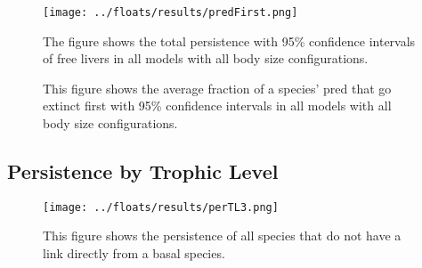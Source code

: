 \documentclass[11pt]{amsart}
\begin{document}
\begin{figure}[h]
\captionsetup[subfigure]{labelfont = it, textfont = it,labelformat = parens,labelsep = space}
    \begin{minipage}{.45\textwidth}
    \end{minipage}
    \begin{minipage}{.45\textwidth}
    \end{minipage}
    \texttt{[image: ../floats/results/predFirst.png]}
\caption{The figure shows the total persistence with 95\% confidence intervals of free livers in all models with all body size configurations.}
    \begin{minipage}{.45\textwidth}
    \end{minipage}
    \begin{minipage}{.45\textwidth}
    \end{minipage}
\caption{This figure shows the average fraction of a species' pred that go extinct first with 95\% confidence intervals in all models with all body size configurations.\label{fig:frac-pred-first}}
\end{figure}

\subsection{Persistence by Trophic Level}

\begin{figure}[h]
\captionsetup[subfigure]{labelfont = it, textfont = it,labelformat = parens,labelsep = space}
    \begin{minipage}{.45\textwidth}
    \end{minipage}
    \begin{minipage}{.45\textwidth}
    \end{minipage}
    \texttt{[image: ../floats/results/perTL3.png]}
    \begin{minipage}{.45\textwidth}
    \end{minipage}
    \begin{minipage}{.45\textwidth}
    \end{minipage}
\caption{This figure shows the persistence of all species that do not have a link directly from a basal species. \label{fig:tl3-all}}
\end{figure}
\end{document}
